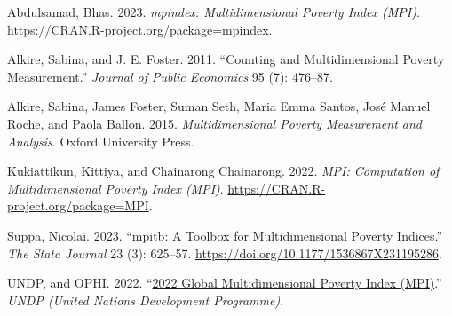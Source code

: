 \hypertarget{refs}{}
\begin{CSLReferences}{1}{0}
\leavevmode{}%
Abdulsamad, Bhas. 2023. \emph{{m}pindex: Multidimensional Poverty Index (MPI)}. \url{https://CRAN.R-project.org/package=mpindex}.

\leavevmode{}%
Alkire, Sabina, and J. E. Foster. 2011. {``Counting and Multidimensional Poverty Measurement.''} \emph{Journal of Public Economics} 95 (7): 476--87.

\leavevmode{}%
Alkire, Sabina, James Foster, Suman Seth, Maria Emma Santos, José Manuel Roche, and Paola Ballon. 2015. \emph{Multidimensional Poverty Measurement and Analysis}. Oxford University Press.

\leavevmode{}%
Kukiattikun, Kittiya, and Chainarong Chainarong. 2022. \emph{MPI: Computation of Multidimensional Poverty Index (MPI)}. \url{https://CRAN.R-project.org/package=MPI}.

\leavevmode{}%
Suppa, Nicolai. 2023. {``{m}pitb: A Toolbox for Multidimensional Poverty Indices.''} \emph{The Stata Journal} 23 (3): 625--57. \url{https://doi.org/10.1177/1536867X231195286}.

\leavevmode{}%
UNDP, and OPHI. 2022. {``\href{}{2022 Global Multidimensional Poverty Index (MPI)}.''} \emph{UNDP (United Nations Development Programme)}.

\end{CSLReferences}



\address{%
Ignacio Girela\\
CONICET - Universidad Nacional de Córdoba\\%
Facultad de Ciencias Económicas\\ Córdoba, Argentina\\
%
\url{https://www.eco.unc.edu.ar/}\\%
\textit{ORCiD: \href{https://orcid.org/0000-0003-3297-3854}{0000-0003-3297-3854}}\\%
\href{mailto:ignacio.girela@unc.edu.ar}{\nolinkurl{ignacio.girela@unc.edu.ar}}%
}
